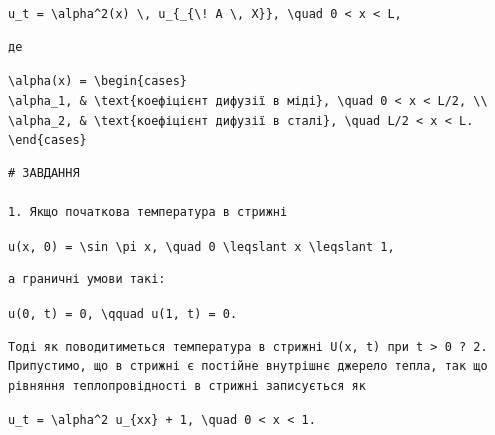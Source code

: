 \documentclass[
  ukrainian,
]{article}
\begin{document}
\texttt{u\_t\ =\ \textbackslash{}alpha\^{}2(x)\ \textbackslash{},\ u\_\{\_\{\textbackslash{}!\ A\ \textbackslash{},\ X\}\},\ \textbackslash{}quad\ 0\ \textless{}\ x\ \textless{}\ L,}

\begin{verbatim}
де
\end{verbatim}

\texttt{\textbackslash{}alpha(x)\ =\ \textbackslash{}begin\{cases\}}
\texttt{\textbackslash{}alpha\_1,\ \&\ \textbackslash{}text\{коефіцієнт\ дифузії\ в\ міді\},\ \textbackslash{}quad\ 0\ \textless{}\ x\ \textless{}\ L/2,\ \textbackslash{}\textbackslash{}}
\texttt{\textbackslash{}alpha\_2,\ \&\ \textbackslash{}text\{коефіцієнт\ дифузії\ в\ сталі\},\ \textbackslash{}quad\ L/2\ \textless{}\ x\ \textless{}\ L.}
\texttt{\textbackslash{}end\{cases\}}

\begin{verbatim}
# ЗАВДАННЯ

1. Якщо початкова температура в стрижні
\end{verbatim}

\texttt{u(x,\ 0)\ =\ \textbackslash{}sin\ \textbackslash{}pi\ x,\ \textbackslash{}quad\ 0\ \textbackslash{}leqslant\ x\ \textbackslash{}leqslant\ 1,}

\begin{verbatim}
а граничні умови такі:
\end{verbatim}

\texttt{u(0,\ t)\ =\ 0,\ \textbackslash{}qquad\ u(1,\ t)\ =\ 0.}

\begin{verbatim}
Тоді як поводитиметься температура в стрижні U(x, t) при t > 0 ? 2. Припустимо, що в стрижні є постійне внутрішнє джерело тепла, так що рівняння теплопровідності в стрижні записується як
\end{verbatim}

\texttt{u\_t\ =\ \textbackslash{}alpha\^{}2\ u\_\{xx\}\ +\ 1,\ \textbackslash{}quad\ 0\ \textless{}\ x\ \textless{}\ 1.}
\end{document}
